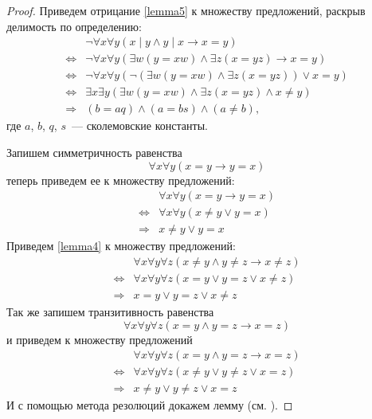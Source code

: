 \documentclass[12pt, a4paper, oneside]{memoir}
\begin{document}
\begin{proof}
    Приведем отрицание \eqref{lemma5} к множеству предложений, раскрыв делимость по определению:
    \begin{align*}
                          & \lnot \forall x \forall y (x \mid y \land y \mid x \rightarrow x = y)                      \\
        \Leftrightarrow{} & \lnot \forall x \forall y (\exists w (y = xw) \land \exists z (x = yz) \rightarrow x = y)  \\
        \Leftrightarrow{} & \lnot \forall x \forall y (\lnot (\exists w (y = xw) \land \exists z (x = yz)) \lor x = y) \\
        \Leftrightarrow{} & \exists x \exists y (\exists w (y = xw) \land \exists z (x = yz) \land x \neq y)           \\
        \Rightarrow{}     & (b = aq) \land (a = bs) \land (a \neq b),
    \end{align*}
    где $a$, $b$, $q$, $s$~--- сколемовские константы.

    Запишем симметричность равенства
    \[\forall x \forall y (x = y \rightarrow y = x)\]
    теперь приведем ее к множеству предложений:
    \begin{align*}
                          & \forall x \forall y (x = y \rightarrow y = x) \\
        \Leftrightarrow{} & \forall x \forall y (x \neq y \lor y = x)     \\
        \Rightarrow{}     & x \neq y \lor y = x
    \end{align*}
    Приведем \eqref{lemma4} к множеству предложений:
    \begin{align*}
                          & \forall x \forall y \forall z (x \neq y \land y \neq z \rightarrow x \neq z) \\
        \Leftrightarrow{} & \forall x \forall y \forall z (x = y \lor y = z \lor x \neq z)               \\
        \Rightarrow{}     & x = y \lor y = z \lor x \neq z
    \end{align*}
    Так же запишем транзитивность равенства
    \[\forall x \forall y \forall z (x = y \land y = z \rightarrow x = z)\]
    и приведем к множеству предложений
    \begin{align*}
                          & \forall x \forall y \forall z (x = y \land y = z \rightarrow x = z) \\
        \Leftrightarrow{} & \forall x \forall y \forall z (x \neq y \lor y \neq z \lor x = z)   \\
        \Rightarrow{}     & x \neq y \lor y \neq z \lor x = z
    \end{align*}
    И с помощью метода резолюций докажем лемму (см. ).
\end{proof}
\end{document}
